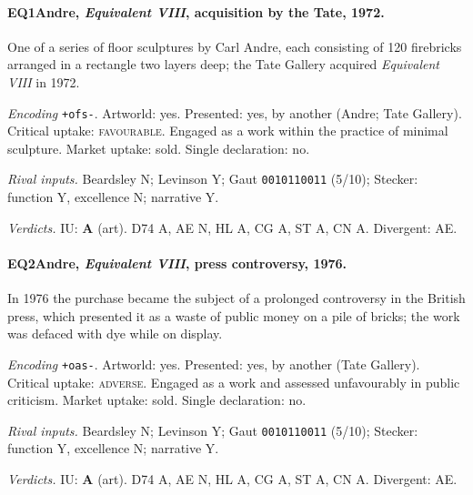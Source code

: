 \paragraph{EQ1\enspace Andre, \emph{Equivalent VIII}, acquisition by the Tate, 1972.}
One of a series of floor sculptures by Carl Andre, each consisting of 120 firebricks arranged in a rectangle two layers deep; the Tate Gallery acquired \emph{Equivalent VIII} in 1972.\par
\noindent\textit{Encoding} \texttt{+ofs-}. Artworld: yes. Presented: yes, by another (Andre; Tate Gallery). Critical uptake: \textsc{favourable}. Engaged as a work within the practice of minimal sculpture. Market uptake: sold. Single declaration: no.\par
\noindent\textit{Rival inputs.} Beardsley N; Levinson Y; Gaut \texttt{0010110011} (5/10); Stecker: function Y, excellence N; narrative Y.\par
\noindent\textit{Verdicts.} IU: \textbf{A} (art). D74 A, AE N, HL A, CG A, ST A, CN A. Divergent: AE.\par

\paragraph{EQ2\enspace Andre, \emph{Equivalent VIII}, press controversy, 1976.}
In 1976 the purchase became the subject of a prolonged controversy in the British press, which presented it as a waste of public money on a pile of bricks; the work was defaced with dye while on display.\par
\noindent\textit{Encoding} \texttt{+oas-}. Artworld: yes. Presented: yes, by another (Tate Gallery). Critical uptake: \textsc{adverse}. Engaged as a work and assessed unfavourably in public criticism. Market uptake: sold. Single declaration: no.\par
\noindent\textit{Rival inputs.} Beardsley N; Levinson Y; Gaut \texttt{0010110011} (5/10); Stecker: function Y, excellence N; narrative Y.\par
\noindent\textit{Verdicts.} IU: \textbf{A} (art). D74 A, AE N, HL A, CG A, ST A, CN A. Divergent: AE.\par

